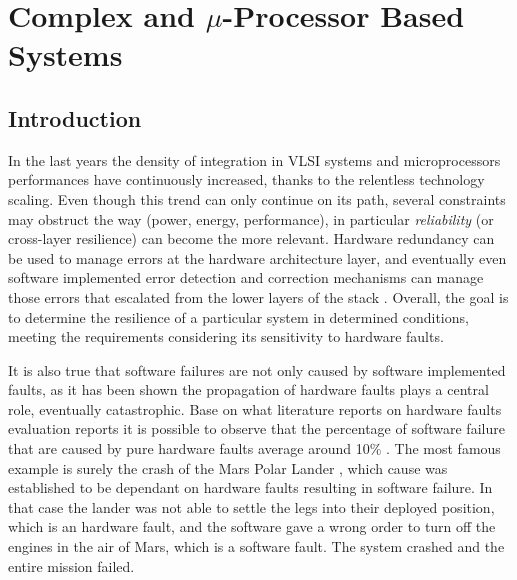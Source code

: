 \documentclass[./dissertation.tex]{subfiles}
\begin{document}
\newpage\null\thispagestyle{empty}\newpage
    \chapter{Complex and $\mu$-Processor Based Systems}
\section{Introduction}
\label{introduction}
In the last years the density of integration in VLSI systems and microprocessors performances have continuously increased, thanks to the relentless technology scaling. Even though this trend can only continue on its path, several constraints may obstruct the way (power, energy, performance), in particular \textit{reliability} (or cross-layer resilience) can become the more relevant. Hardware redundancy can be used to manage errors at the hardware architecture layer, and eventually even software implemented error detection and correction mechanisms can manage those errors that escalated from the lower layers of the stack \cite{7544311} \cite{6560692}. Overall, the goal is to determine the resilience of a particular system in determined conditions, meeting the requirements considering its sensitivity to hardware faults.

It is also true that software failures are not only caused by software implemented faults, as it has been shown \cite{6258310} the propagation of hardware faults plays a central role, eventually catastrophic. Base on what literature reports on hardware faults evaluation reports \cite{EBRAHIMI20141000} \cite{7604674} it is possible to observe that the percentage of software failure that are caused by pure hardware faults average around 10\% \cite{kooli:lirmm-01693156}. The most famous example is surely the crash of the Mars Polar Lander \cite{1181509}, which cause was established to be dependant on hardware faults resulting in software failure. In that case the lander was not able to settle the legs into their deployed position, which is an hardware fault, and the software gave a wrong order to turn off the engines in the air of Mars, which is a software fault. The system crashed and the entire mission failed.
\end{document}
